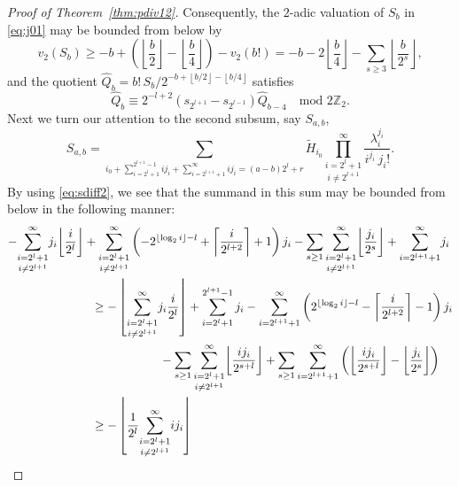\documentclass[12pt,reqno]{amsart}
\numberwithin{equation}{section}
\theoremstyle{remark}
\begin{document}
\begin{proof}[Proof of Theorem~{\em \ref{thm:pdiv12}}]
Consequently,
the $2$-adic valuation of $S_b$ in \eqref{eq:j01} may be bounded
from below by
\begin{equation} \label{eq:pj01}
v_2(S_b)\ge-b
+\left({\left\lfloor{\frac {b} {2}}\right\rfloor}-{\left\lfloor{\frac {b} {4}}\right\rfloor}\right)-v_2(b!)=
-b-2{\left\lfloor{\frac {b} {4}}\right\rfloor}-\sum_{s\ge3}{\left\lfloor{\frac {b} {2^s}}\right\rfloor}, 
\end{equation}
and the quotient
$\widehat Q_b=b!\,S_b/2^{-b+{\left\lfloor{b/2}\right\rfloor}-{\left\lfloor{b/4}\right\rfloor}}$ 
satisfies
\begin{equation} \label{eq:j01rek}
\widehat Q_b\equiv 2^{-l+2}(s_{2^{l+1}}-s_{2^{l-1}})\widehat Q_{b-4} 
\quad \text{mod $2{\mathbb{Z}}_2$} .
\end{equation}
Next we turn our attention to the second subsum, say $S_{a,b}$,
\begin{equation*} 
S_{a,b}=\sum_{i_0+\sum_{i=2^l+1}^{2^{l+1}-1} ij_i
+\sum_{i=2^{l+1}+1}^\infty ij_i=(a-b)2^l+r}
\widetilde H_{i_0}
\underset{i\ne 2^{l+1}}{\prod _{i=2^l+1} ^{\infty}}
\frac {{\lambda}_i^{j_i}}
{i^{j_i}\,j_i!}.
\end{equation*}
By using \eqref{eq:sdiff2}, we see that
the summand in this sum may be bounded from below in the following manner:
{\allowdisplaybreaks
\begin{align}
\notag
-\underset{i\ne 2^{l+1}}
{\sum_{i=2^l+1}^\infty} j_i&{\left\lfloor{\frac {i} {2^{l}}}\right\rfloor} 
+\underset{i\ne2^{l+1}}{\sum_{i=2^{l}+1}^{\infty}}
\left(-2^{{\left\lfloor{\log_2i}\right\rfloor}-l}+{\left\lceil{\frac {i} {2^{l+2}}}\right\rceil}+1\right)j_{i}
-\sum_{s\ge1}\underset{i\ne 2^{l+1}}
{\sum_{i=2^l+1}^\infty}{\left\lfloor{\frac {j_i} {2^s}}\right\rfloor}
+{\sum_{i=2^{l+1}+1}^\infty} j_i\\
\notag
&\kern1cm
\ge
-\left\lfloor \underset{i\ne 2^{l+1}}
{\sum_{i=2^l+1}^\infty} j_i\frac {i} {2^{l}} \right\rfloor
+\sum_{i=2^{l}+1}^{2^{l+1}-1} j_{i}
-\sum_{i=2^{l+1}+1}^{\infty} 
\left(2^{{\left\lfloor{\log_2i}\right\rfloor}-l}-{\left\lceil{\frac {i} {2^{l+2}}}\right\rceil}-1\right)j_{i}\\
\notag
&\kern3cm
-\sum_{s\ge1}\underset{i\ne 2^{l+1}}
{\sum_{i=2^l+1}^\infty}{\left\lfloor{\frac {ij_i} {2^{s+l}}}\right\rfloor}
+\sum_{s\ge1}
{\sum_{i=2^{l+1}+1}^\infty}\left({\left\lfloor{\frac {ij_i} {2^{s+l}}}\right\rfloor}
-
{\left\lfloor{\frac {j_i} {2^{s}}}\right\rfloor}\right)\\
\notag
&\kern1cm
\ge
-\left\lfloor\frac {1} {2^l}\underset{i\ne 2^{l+1}}
{\sum_{i=2^l+1}^\infty} ij_i\right\rfloor

\end{align}}
\end{proof}
\end{document}
